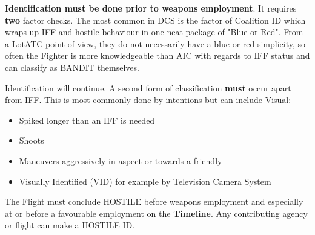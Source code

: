 \textbf{Identification must be done prior to weapons employment}. It requires
\textbf{two} factor checks. The most common in DCS is the factor of Coalition
ID which wraps up IFF and hostile behaviour in one neat package of "Blue or
Red". From a LotATC point of view, they do not necessarily have a blue or red
simplicity, so often the Fighter is more knowledgeable than AIC with regards to
IFF status and can classify as BANDIT themselves.

Identification will continue. A second form of classification \textbf{must}
occur apart from IFF. This is most commonly done by intentions but can include
Visual:

\begin{itemize}
  \item Spiked longer than an IFF is needed
  \item Shoots
  \item Maneuvers aggressively in aspect or towards a friendly
  \item Visually Identified (VID) for example by Television Camera System
\end{itemize}

The Flight must conclude HOSTILE before weapons employment and especially at or
before a favourable employment on the \textbf{Timeline}. Any contributing
agency or flight can make a HOSTILE ID.


